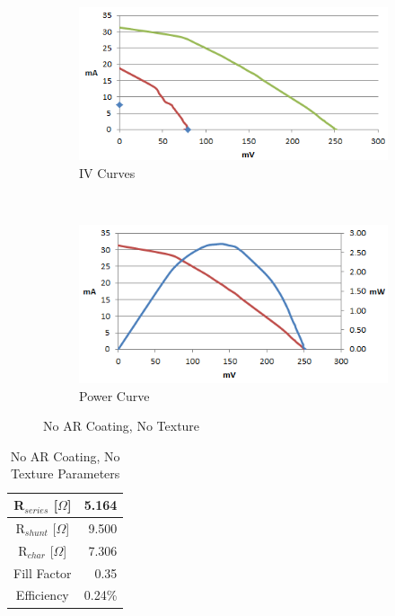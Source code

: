 \documentclass[letter,12pt]{article}
\begin{document}
		\begin{figure}[h!]
			\centering
			\begin{subfigure}[b]{.45\textwidth}
				\includegraphics[width=\textwidth]{./Images/IV_Curves/Nothing_IV.png}
				\caption{IV Curves}
			\end{subfigure}
			~
			\begin{subfigure}[b]{.45\textwidth}
				\includegraphics[width=\textwidth]{./Images/IV_Curves/Nothing_PV.png}
				\caption{Power Curve}
			\end{subfigure}
			
			\caption{No AR Coating, No Texture}
			\label{fig:Nothing}
		\end{figure}
		
		\begin{table}[h!]
			\centering
			\begin{tabular}{|c | r|}
				\hline
				R$_{series}$ [$\Omega$] & 5.164 \\
				\hline
				R$_{shunt}$ [$\Omega$] & 9.500 \\
				\hline
				R$_{char}$ [$\Omega$] & 7.306 \\
				\hline
				Fill Factor & 0.35 \\
				\hline
				Efficiency & 0.24\% \\
				\hline
			\end{tabular}
			\caption{No AR Coating, No Texture Parameters}
		\end{table}
		
\end{document}

